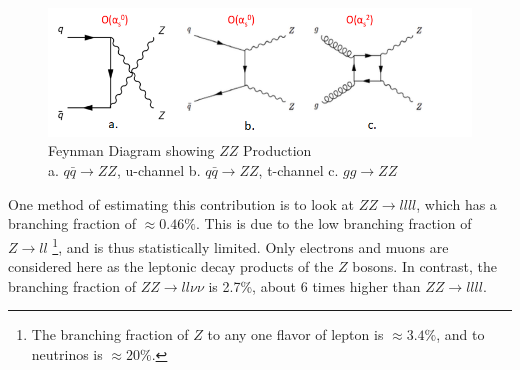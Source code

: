 \documentclass[11pt,a4paper,final]{report}
\newcommand{\ZZ}{$ZZ\to ll\nu\nu$ }
\begin{document}
\begin{figure}[H]
	\begin{center}
		\includegraphics[scale=0.5]{ZZ.png}
		\captionsetup{justification=centering}
		\caption{Feynman Diagram showing $ZZ$ Production \\ a. $q\bar{q}\rightarrow ZZ$, u-channel \hspace{1 cm} b. $q\bar{q}\rightarrow ZZ$, t-channel \hspace{1cm} c. $gg\rightarrow ZZ$}
		\label{fig:ZZdiag}
	\end{center}
\end{figure}

One method of estimating this contribution is to look at $ZZ\rightarrow llll$, which has a branching fraction of $\approx 0.46 \%$. This is due to the low branching fraction of $Z\rightarrow ll$ \footnote{The branching fraction of $Z$ to any one flavor of lepton is $\approx 3.4\%$, and to neutrinos is $\approx 20\%$.}, and is thus statistically limited. Only electrons and muons are considered here as the leptonic decay products of the $Z$ bosons. In contrast, the branching fraction of \ZZ is 2.7\%, about 6 times higher than $ZZ\rightarrow llll$.
\end{document}
